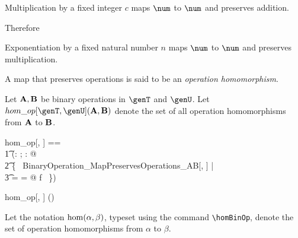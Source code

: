 \documentclass{amsart}
\begin{document}
\begin{example}
Multiplication by a fixed integer $c$ maps $\num$ to $\num$ and preserves addition.

Therefore
\end{example}

\begin{example}
Exponentiation by a fixed natural number $n$ maps $\num$ to $\num$ and preserves multiplication.
\end{example}

A map that preserves operations is said to be an \textit{operation homomorphism}.

Let $\mathbf{A}, \mathbf{B}$ be binary operations in $\genT$ and $\genU$. 
Let $hom\_op[\genT, \genU](\strucA, \strucB)$ denote the set of all operation homomorphisms from $\mathbf{A}$ to $\mathbf{B}$.

\begin{zed}
	hom\_op[\genT, \genU] == \\
	\t1	(\lambda \alpha: \binop \genT; \beta: \binop \genU @ \\
	\t2		\{~ BinaryOperation\_MapPreservesOperations\_AB[\genT, \genU] | \\
	\t3			\alpha = \strucA \land \beta = \strucB @ f ~\})
\end{zed}

\begin{remark}
\begin{zed}
	hom\_op[\setT, \setU] \in \binop \setT \cross \binop \setU \fun \power (\setT \pfun \setU)
\end{zed}
\end{remark}

Let the notation $\operatorname{hom}(\alpha, \beta)$,  typeset using the command \verb|\homBinOp|, 
denote the set of operation homomorphisms from $\alpha$ to $\beta$.
\end{document}

